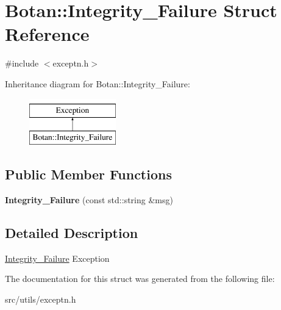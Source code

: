 \hypertarget{structBotan_1_1Integrity__Failure}{\section{Botan\-:\-:Integrity\-\_\-\-Failure Struct Reference}
\label{structBotan_1_1Integrity__Failure}
}


{\ttfamily \#include $<$exceptn.\-h$>$}

Inheritance diagram for Botan\-:\-:Integrity\-\_\-\-Failure\-:\begin{figure}[H]
\begin{center}
\leavevmode
\includegraphics[height=2.000000cm]{structBotan_1_1Integrity__Failure}
\end{center}
\end{figure}
\subsection*{Public Member Functions}
\begin{DoxyCompactItemize}
\item 
\hypertarget{structBotan_1_1Integrity__Failure_a824633b953e418facecde94c57ec0ea2}{{\bfseries Integrity\-\_\-\-Failure} (const std\-::string \&msg)}\label{structBotan_1_1Integrity__Failure_a824633b953e418facecde94c57ec0ea2}

\end{DoxyCompactItemize}


\subsection{Detailed Description}
\hyperlink{structBotan_1_1Integrity__Failure}{Integrity\-\_\-\-Failure} Exception 

The documentation for this struct was generated from the following file\-:\begin{DoxyCompactItemize}
\item 
src/utils/exceptn.\-h\end{DoxyCompactItemize}
